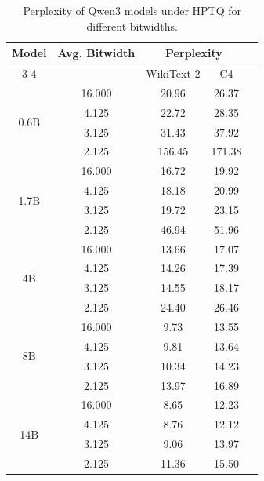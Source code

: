 \documentclass{article} %
\begin{document}
\begin{table}[htpb]
\caption{Perplexity of Qwen3 models under HPTQ for different bitwidths.}
\label{tab:huff_results_all}
\begin{center}
\begin{tabular}{ccccc}
\toprule
Model & Avg. Bitwidth & \multicolumn{2}{c}{Perplexity}  \\
\cmidrule(r){3-4}
      &           & WikiText-2 & C4 \\
\midrule
\multirow{4}{*}{0.6B} & 16.000 & 20.96 & 26.37 \\
           & 4.125 & 22.72 & 28.35 \\
           & 3.125 & 31.43 & 37.92 \\
           & 2.125 & 156.45 & 171.38 \\
\midrule
\multirow{4}{*}{1.7B} & 16.000 & 16.72 & 19.92 \\
           & 4.125 & 18.18 & 20.99 \\
           & 3.125 & 19.72 & 23.15 \\
           & 2.125 & 46.94 & 51.96 \\
\midrule
\multirow{4}{*}{4B}   & 16.000 & 13.66 & 17.07 \\
           & 4.125 & 14.26 & 17.39 \\
           & 3.125 & 14.55 & 18.17 \\
           & 2.125 & 24.40 & 26.46 \\
\midrule
\multirow{4}{*}{8B}   & 16.000 & 9.73 & 13.55 \\
           & 4.125 & 9.81 & 13.64 \\
           & 3.125 & 10.34 & 14.23 \\
           & 2.125 & 13.97 & 16.89 \\
\midrule
\multirow{4}{*}{14B}  & 16.000 & 8.65 & 12.23 \\
           & 4.125 & 8.76 & 12.12 \\
           & 3.125 & 9.06 & 13.97 \\
           & 2.125 & 11.36 & 15.50 \\
\bottomrule
\end{tabular}
\end{center}
\end{table}
\end{document}
